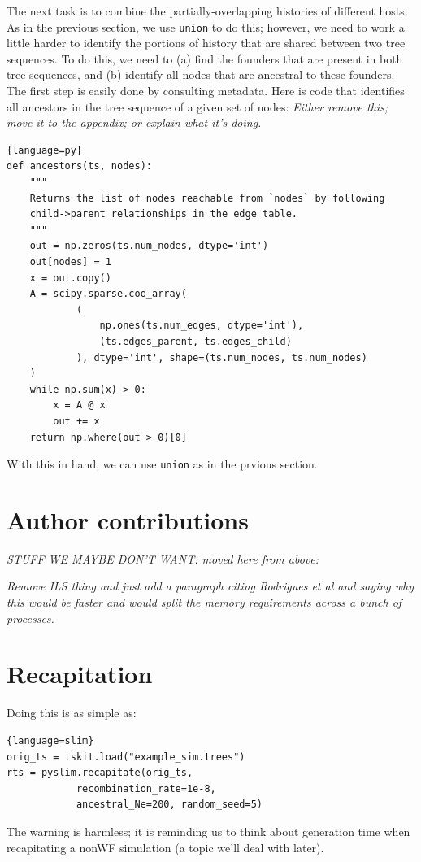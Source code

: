 \documentclass[12pt]{article}
\newcommand{\comment}[1]{\textit{\color{green} #1}}
\begin{document}
The next task is to combine the partially-overlapping histories of different hosts.
As in the previous section, we use \verb|union| to do this;
however, we need to work a little harder
to identify the portions of history that are shared between two tree sequences.
To do this, we need to
(a) find the founders that are present in both tree sequences,
and (b) identify all nodes that are ancestral to these founders.
The first step is easily done by consulting metadata.
Here is code that identifies all ancestors in the tree sequence
of a given set of nodes:
\comment{Either remove this; move it to the appendix; or explain what it's doing.}
\begin{lstlisting}{language=py}
def ancestors(ts, nodes):
    """
    Returns the list of nodes reachable from `nodes` by following
    child->parent relationships in the edge table.
    """
    out = np.zeros(ts.num_nodes, dtype='int')
    out[nodes] = 1
    x = out.copy()
    A = scipy.sparse.coo_array(
            (
                np.ones(ts.num_edges, dtype='int'),
                (ts.edges_parent, ts.edges_child)
            ), dtype='int', shape=(ts.num_nodes, ts.num_nodes)
    )
    while np.sum(x) > 0:
        x = A @ x
        out += x
    return np.where(out > 0)[0]
\end{lstlisting}
With this in hand, we can use \verb|union|
as in the prvious section.



\section*{Author contributions}



\newpage
\appendix

\comment{STUFF WE MAYBE DON'T WANT: moved here from above:}

\comment{Remove ILS thing and just add a paragraph citing Rodrigues et al and saying why this would be faster and would split the memory requirements across a bunch of processes.}

\section{Recapitation}


Doing this is as simple as:

\begin{lstlisting}{language=slim}
orig_ts = tskit.load("example_sim.trees")
rts = pyslim.recapitate(orig_ts,
            recombination_rate=1e-8,
            ancestral_Ne=200, random_seed=5)
\end{lstlisting}
The warning is harmless; it is reminding us to think about generation time
when recapitating a nonWF simulation (a topic we'll deal with later).
\end{document}
